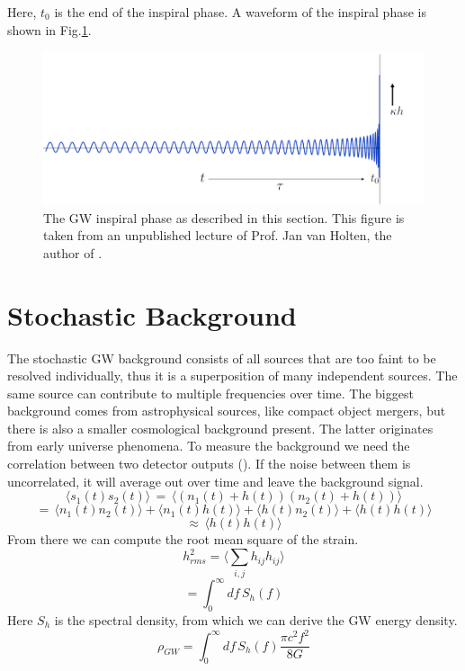 Here, $t_0$ is the end of the inspiral phase. A waveform of the inspiral phase is shown in Fig.\ref{inspiral_van_holten}.

\begin{figure}
    \centering
    \includegraphics[width=1\linewidth]{Images/waveform_van_holten.PNG}
    \caption{The GW inspiral phase as described in this section. This figure is taken from an unpublished lecture of Prof. Jan van Holten, the author of \cite{van_holten_gravitational_2019}.}
    \label{inspiral_van_holten}
\end{figure} 

\section{Stochastic Background}
The stochastic GW background consists of all sources that are too faint to be resolved individually, thus it is a superposition of many independent sources. The same source can contribute to multiple frequencies over time. 
The biggest background comes from astrophysical sources, like compact object mergers, but there is also a smaller cosmological background present. The latter originates from early universe phenomena. 
To measure the background we need the correlation between two detector
outputs (\cite{christensen_stochastic_2019}). If the noise between them is uncorrelated, it will average out over time and leave the background signal.
\begin{equation}
    \langle s_1 (t) s_2(t)\rangle \, = \, \langle(n_1(t) + h(t))(n_2(t) + h(t))\rangle
\end{equation}
\begin{equation}
    = \, \langle n_1(t) n_2(t)\rangle + \langle n_1(t)h(t)\rangle + \langle h(t)n_2(t)\rangle  + \langle h(t)h(t)\rangle  
\end{equation}
\begin{equation}
    \approx \, \langle h(t)h(t)\rangle 
\end{equation}
From there we can compute the root mean square of the strain.
\begin{equation}
    h_{rms}^2 = \langle \sum_{i,j} h_{ij} h_{ij}\rangle 
\end{equation}
\begin{equation}
    = \int_0^\infty df \, S_h (f)
\end{equation}
Here $S_h$ is the spectral density, from which we can derive the GW energy
density.
\begin{equation}
    \rho_{GW} = \int_0^\infty df \, S_h(f) \frac{\pi c^2 f^2}{8G}
\end{equation} 

